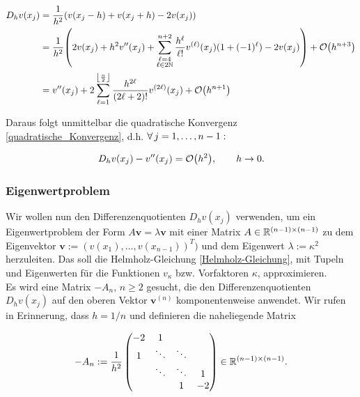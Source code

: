 \begin{align*}
  D_h v(x_j)
  & = \frac{1}{h^2} {\left ( 
    v(x_j - h) + v(x_j + h) - 2 v(x_j)
   \right )} \\
  & = \frac{1}{h^2} {\left ( 
        2 v(x_j) +
        h^2 v^{\prime \prime}(x_j) +
        \sum_{\substack{\ell = 4 \\ \ell \in 2 \mathbb{N}}}^{n+2}
        \frac{h^\ell}{\ell !}
        v^{(\ell)}(x_j)
        (1 + (-1)^\ell) -
        2 v(x_j)
       \right )} +
      \mathcal{O} {\left ( h^{n+3} \right )} \\
  & = v^{\prime \prime}(x_j) +
      2 \sum_{\ell = 1}^{\left \lfloor \frac{n}{2} \right \rfloor}
      \frac{h^{2 \ell}}{(2 \ell + 2)!}
      v^{(2 \ell)}(x_j) +
      \mathcal{O} {\left ( h^{n+1} \right )}
\end{align*}

Daraus folgt unmittelbar die quadratische Konvergenz \eqref{quadratische_Konvergenz}, d.h. $\forall \, j = 1, \ldots, n-1:$

\begin{align*}
  D_h v(x_j) - v^{\prime \prime}(x_j) = \mathcal{O} {\left ( h^2 \right )}, \qquad
  h \to 0.
\end{align*}

\subsubsection{Eigenwertproblem}

Wir wollen nun den Differenzenquotienten $D_h v(x_j)$ verwenden, um ein Eigenwertproblem der Form $A \mathbf{v} = \lambda \mathbf{v}$ mit einer Matrix $A \in \mathbb{R}^{(n-1) \times (n-1)}$ zu dem Eigenvektor $\mathbf{v} := (v(x_1), \ldots, v(x_{n-1}))^T)$ und dem Eigenwert $\lambda := \kappa^2$ herzuleiten. Das soll die Helmholz-Gleichung \eqref{Helmholz-Gleichung}, mit Tupeln und Eigenwerten für die Funktionen $v_\kappa$ bzw. Vorfaktoren $\kappa$, approximieren. \\

Es wird eine Matrix $-A_n$, $n \geq 2$ gesucht, die den Differenzenquotienten $D_h v(x_j)$ auf den oberen Vektor $\mathbf{v}^{(n)}$ komponentenweise anwendet. Wir rufen in Erinnerung, dass $h = 1/n$ und definieren die naheliegende Matrix

\begin{align*}
  -A_n :=
  \frac{1}{h^2}
  \begin{pmatrix}
    -2 &  1      &        &    \\
     1 &  \ddots & \ddots &    \\
       &  \ddots & \ddots &  1 \\
       &         & 1      & -2
  \end{pmatrix}
  \in \mathbb{R}^{(n-1) \times (n-1)}.
\end{align*}

